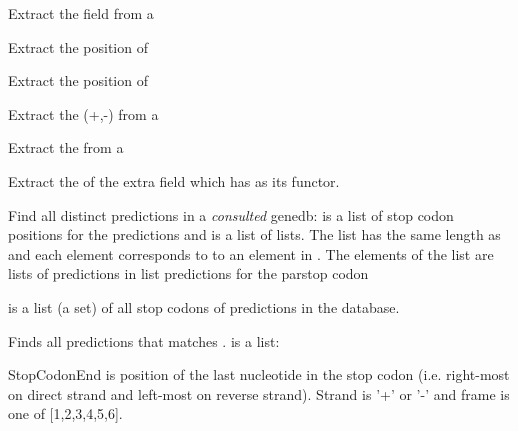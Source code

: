 \begin{description}
Extract the  field from a 

Extract the  position of 

Extract the  position of 

Extract the  (+,-) from a 

Extract the  from a 

Extract the  of the extra field which has  as its functor.

Find all distinct predictions in a \textit{consulted} genedb:
 is a list of stop codon positions for the predictions
and  is a list of lists. The list has the same length
as  and each element corresponds to to an element in .
The elements of the list are lists of predictions in
list predictions for the parstop codon 

 is a list (a set) of all stop codons of predictions in the database.

Finds all predictions that matches .  is a list:

\begin{code}
\end{code}

StopCodonEnd is position of the last nucleotide in the stop codon (i.e. right-most on direct strand and
left-most on reverse strand). Strand is '+' or '-' and frame is one of [1,2,3,4,5,6].
\end{description}

